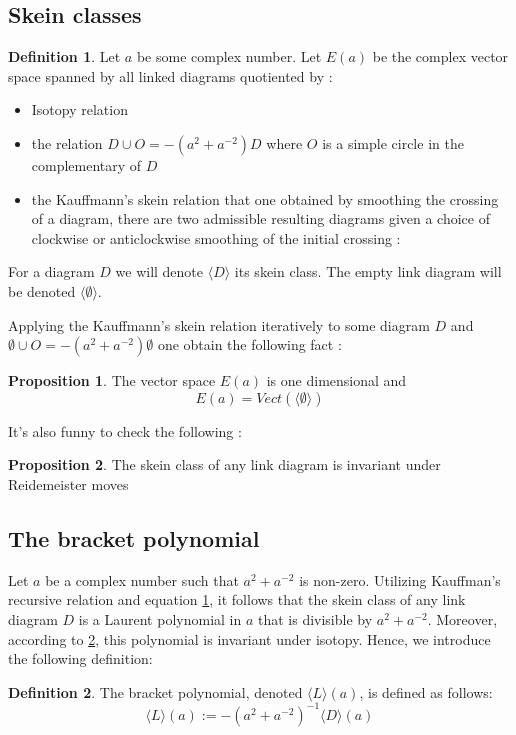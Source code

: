 \documentclass[11pt]{article}
\theoremstyle{definition}
\newtheorem{Prop}{Proposition}[section]
\newtheorem{Def}{Definition}[section]
\begin{document}
\subsection{\Large \textbf{Skein classes}}
\begin{Def} Let $a$ be some complex number. Let $E(a)$ be the complex vector space spanned by all linked diagrams quotiented by : \begin{itemize}
\item Isotopy relation
\item the relation $D\cup O=-(a^2+a^{-2})D$ where $O$ is a simple circle in the complementary of $D$
\item the Kauffmann's skein relation that one obtained by smoothing the crossing of a diagram, there are two admissible resulting diagrams  given a choice of clockwise or anticlockwise smoothing of the initial crossing :  \vspace{10cm}
\end{itemize}
For a diagram $D$ we will denote $\langle D\rangle $ its skein class. The empty link diagram will be denoted $\langle \emptyset\rangle$.
\end{Def}
Applying the Kauffmann's skein relation iteratively to some diagram  $D$ and $\emptyset\cup O=-(a^2+a^{-2})\emptyset$  one obtain the following fact :
\begin{Prop}\label{Edim1}
The vector space $E(a)$ is one dimensional and $$E(a)=Vect(\langle\emptyset\rangle)$$ 
\end{Prop}
It's also funny to check the following : 
\begin{Prop}\label{skeininv}
The skein class of any link diagram is invariant under Reidemeister moves
\end{Prop}

\subsection{\Large \textbf{The bracket polynomial}} 

Let \(a\) be a complex number such that \(a^2+a^{-2}\) is non-zero. Utilizing Kauffman's recursive relation and equation \ref{Edim1}, it follows that the skein class of any link diagram \(D\) is a Laurent polynomial in \(a\) that is divisible by \(a^2+a^{-2}\). Moreover, according to \ref{skeininv}, this polynomial is invariant under isotopy. Hence, we introduce the following definition:

\begin{Def} The bracket polynomial, denoted \(\langle L\rangle (a)\), is defined as follows:
\[ \langle L\rangle (a) := -(a^2+a^{-2})^{-1}\langle D\rangle(a) \]
\end{Def}
\end{document}
